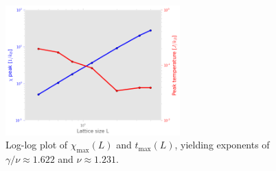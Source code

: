 \documentclass[11pt, oneside]{article}
\begin{document}
\begin{figure}[H]
   \centering
   \includegraphics[width=0.6\textwidth]{img/2D/gam_nu} %
   \caption{Log-log plot of $\chi_\text{max}(L)$ and $t_\text{max}(L)$, yielding exponents of $\gamma/\nu\approx1.622$ and $\nu\approx1.231$.}
   \label{fig:2D_gam_nu}
\end{figure}
\end{document}
